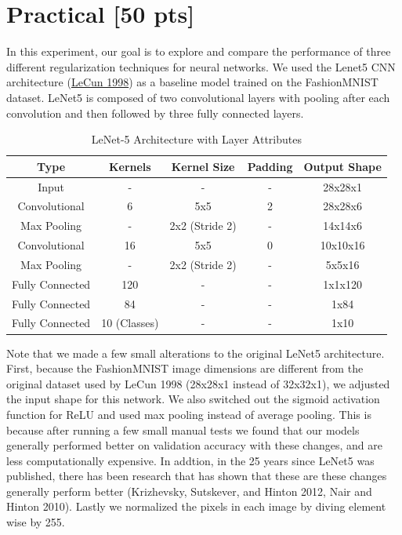 \documentclass{article}
\begin{document}
\section{Practical [50 pts]}

In this experiment, our goal is to explore and compare the performance of three different regularization techniques for neural networks. We used the Lenet5 CNN architecture (\href{http://vision.stanford.edu/cs598_spring07/papers/Lecun98.pdf}{LeCun 1998}) as a baseline model trained on the FashionMNIST dataset. LeNet5 is composed of two convolutional layers with pooling after each convolution and then followed by three fully connected layers. 

\begin{table}[ht]
    \centering
    \begin{tabular}{|c|c|c|c|c|}
        \hline
        \textbf{Type} & \textbf{Kernels} & \textbf{Kernel Size} & \textbf{Padding} & \textbf{Output Shape} \\
        \hline
        Input         & -                & -                & -                     & 28x28x1 \\
        \hline
        Convolutional & 6                & 5x5              & 2                     & 28x28x6 \\
        \hline
        Max Pooling   & -                & 2x2 (Stride 2)   & -                     & 14x14x6 \\
        \hline
        Convolutional & 16               & 5x5              & 0                     & 10x10x16 \\
        \hline
        Max Pooling   & -                & 2x2 (Stride 2)   & -                     & 5x5x16 \\
        \hline
        Fully Connected & 120              & -              & -                     & 1x1x120 \\
        \hline
        Fully Connected & 84              & -               & -                     & 1x84 \\
        \hline
        Fully Connected & 10 (Classes)    & -               & -                     & 1x10 \\
        \hline
    \end{tabular}
    \caption{LeNet-5 Architecture with Layer Attributes}
    \label{tab:lenet5}
\end{table}


Note that we made a few small alterations to the original LeNet5 architecture. First, because the FashionMNIST image dimensions are different from the original dataset used by LeCun 1998 (28x28x1 instead of 32x32x1), we adjusted the input shape for this network. We also switched out the sigmoid activation function for ReLU and used max pooling instead of average pooling. This is because after running a few small manual tests we found that our models generally performed better on validation accuracy with these changes, and are less computationally expensive. In addtion, in the 25 years since LeNet5 was published, there has been research that has shown that these are these changes generally perform better (Krizhevsky, Sutskever, and Hinton 2012, Nair and Hinton 2010). Lastly we normalized the pixels in each image by diving element wise by 255. 
\end{document}

